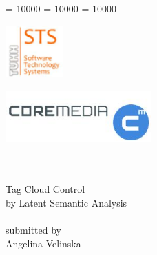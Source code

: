 \documentclass[12pt,a4paper]{extreport}
\begin{document}
\clubpenalty = 10000
\widowpenalty = 10000 
\displaywidowpenalty = 10000

\newenvironment{summary}{\begin{quotation}\it\textbf{Summary.\space}}{\end{quotation}\vspace{0.3cm}}
\begin{titlepage}


\begin{minipage}{1\linewidth}
\begin{flushright}
\begin{minipage}[h]{0.4\linewidth}
\includegraphics[height=2cm]{img/STSlogo}
\end{minipage}
\hspace{0.5cm}
\begin{minipage}[h]{0.4\linewidth}
\includegraphics[height=2cm]{img/CoremediaLogo}
\end{minipage}\\
\bigskip
\Huge
\hrulefill\\
\bigskip
Tag Cloud Control \\by Latent Semantic Analysis\\
\hrulefill\\ \bigskip \bigskip
\normalsize submitted by\\
\large
Angelina Velinska\\
\vspace{0.5cm}
\end{flushright}
\end{minipage}

\vspace{5.5cm}

\begin{minipage}[b]{1\linewidth}
\begin{flushright}
\bigskip


\end{flushright}
\end{minipage}


\end{titlepage}
\end{document}
